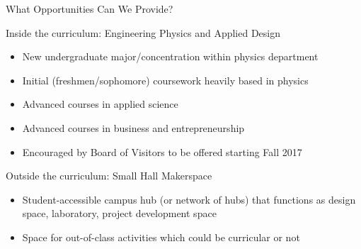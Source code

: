 \documentclass[xcolor=table,compress,professionalfonts,pdfpagelabels]{beamer}
\begin{document}
\begin{frame}{What Opportunities Can We Provide?}
 \begin{block}{Inside the curriculum: Engineering Physics and Applied Design}
  \begin{itemize}
   \item New undergraduate major/concentration within physics department
   \item Initial (freshmen/sophomore) coursework heavily based in physics
   \item Advanced courses in applied science
   \item Advanced courses in business and entrepreneurship
   \item Encouraged by Board of Visitors to be offered starting Fall 2017
  \end{itemize}
 \end{block}
 \begin{block}{Outside the curriculum: Small Hall Makerspace}
  \begin{itemize}
   \item Student-accessible campus hub (or network of hubs) that functions as design space, laboratory, project development space
   \item Space for out-of-class activities which could be curricular or not
  \end{itemize}
 \end{block}
\end{frame}
\end{document}
